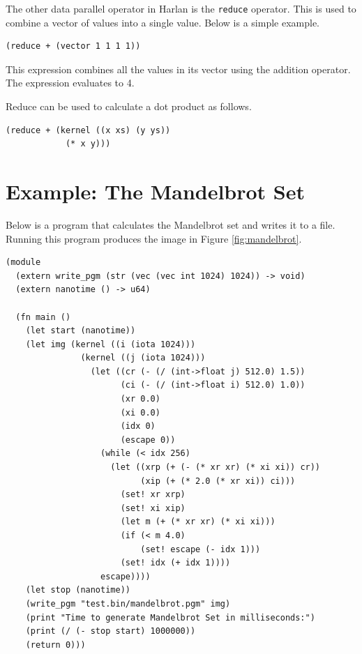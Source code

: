 \documentclass[oneside]{report}
\begin{document}
The other data parallel operator in Harlan is the \lstinline{reduce}
operator. This is used to combine a vector of values into a single
value. Below is a simple example.

\begin{lstlisting}
(reduce + (vector 1 1 1 1))  
\end{lstlisting}

This expression combines all the values in its vector using the
addition operator. The expression evaluates to 4.

Reduce can be used to calculate a dot product as follows.

\begin{lstlisting}
(reduce + (kernel ((x xs) (y ys))
            (* x y)))
\end{lstlisting}

\section{Example: The Mandelbrot Set}

Below is a program that calculates the Mandelbrot set and writes it to
a file.  Running this program produces the image in Figure
\ref{fig:mandelbrot}.

\begin{lstlisting}
(module
  (extern write_pgm (str (vec (vec int 1024) 1024)) -> void)
  (extern nanotime () -> u64)
  
  (fn main ()
    (let start (nanotime))
    (let img (kernel ((i (iota 1024)))
               (kernel ((j (iota 1024)))
                 (let ((cr (- (/ (int->float j) 512.0) 1.5))
                       (ci (- (/ (int->float i) 512.0) 1.0))
                       (xr 0.0)
                       (xi 0.0)
                       (idx 0)
                       (escape 0))
                   (while (< idx 256)
                     (let ((xrp (+ (- (* xr xr) (* xi xi)) cr))
                           (xip (+ (* 2.0 (* xr xi)) ci)))
                       (set! xr xrp)
                       (set! xi xip)
                       (let m (+ (* xr xr) (* xi xi)))
                       (if (< m 4.0)
                           (set! escape (- idx 1)))
                       (set! idx (+ idx 1))))
                   escape))))
    (let stop (nanotime))
    (write_pgm "test.bin/mandelbrot.pgm" img)
    (print "Time to generate Mandelbrot Set in milliseconds:")
    (print (/ (- stop start) 1000000))
    (return 0)))  
\end{lstlisting}
\end{document}
